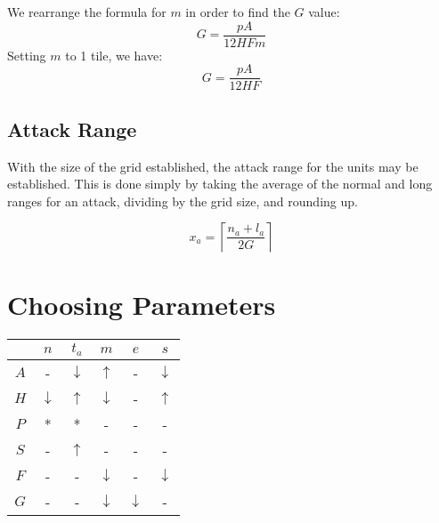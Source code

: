 \documentclass[twocolumn]{article}
\begin{document}
We rearrange the formula for $m$ in order to find the $G$ value:
\[
    G = \frac
            {p A}
            {12 H F m}
\]
Setting $m$ to 1 tile, we have:
\[
    G = \frac
            {p A}
            {12 H F}
\]

\subsection{Attack Range}

With the size of the grid established, the attack range for the units may be established.
This is done simply by taking the average of the normal and long ranges for an attack,
dividing by the grid size,
and rounding up.

\[
    x_a = \left\lceil\frac
        {n_a + l_a}
        {2 G}
        \right\rceil
\]






\section{Choosing Parameters}\label{sec:params}

\begin{table}
\begin{tabular}{c|c|c|c|c|c}
        &   $n$             &   $t_a$           &   $m$             &   $e$             &   $s$             \\
    \hline
    $A$ &   -               &   $\downarrow$    &   $\uparrow$      &   -               &   $\downarrow$    \\
    $H$ &   $\downarrow$    &   $\uparrow$      &   $\downarrow$    &   -               &   $\uparrow$      \\
    $P$ &   *               &   *               &   -               &   -               &   -               \\
    $S$ &   -               &   $\uparrow$      &   -               &   -               &   -               \\
    $F$ &   -               &   -               &   $\downarrow$    &   -               &   $\downarrow$    \\
    $G$ &   -               &   -               &   $\downarrow$    &   $\downarrow$    &   -
\end{tabular}
\end{table}
\end{document}
